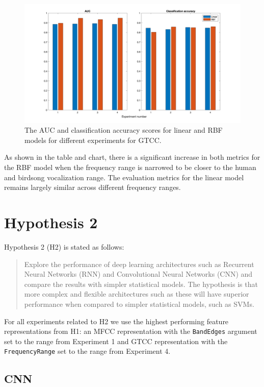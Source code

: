 \begin{figure}[ht]
  \centering
  \includegraphics[width=\textwidth]{figures/hyp1_gtcc.png}
  \caption{The AUC and classification accuracy scores for linear and RBF models
  for different experiments for GTCC.}\label{fig:hyp1_gtcc}
\end{figure}

As shown in the table and chart, there is a significant increase in both metrics
for the RBF model when the frequency range is narrowed to be closer to the human
and birdsong vocalization range. The evaluation metrics for the linear model
remains largely similar across different frequency ranges.

\section{Hypothesis 2}

Hypothesis 2 (H2) is stated as follows:

\begin{quote}
Explore the performance of deep learning architectures such as Recurrent Neural
Networks (RNN) and Convolutional Neural Networks (CNN) and compare the results
with simpler statistical models. The hypothesis is that more complex and
flexible architectures such as these will have superior performance when
compared to simpler statistical models, such as SVMs.
\end{quote}

For all experiments related to H2 we use the highest performing feature
representations from H1: an MFCC representation with the \texttt{BandEdges}
argument set to the range from Experiment 1 and GTCC representation with the
\texttt{FrequencyRange} set to the range from Experiment 4.

\subsection{CNN}

